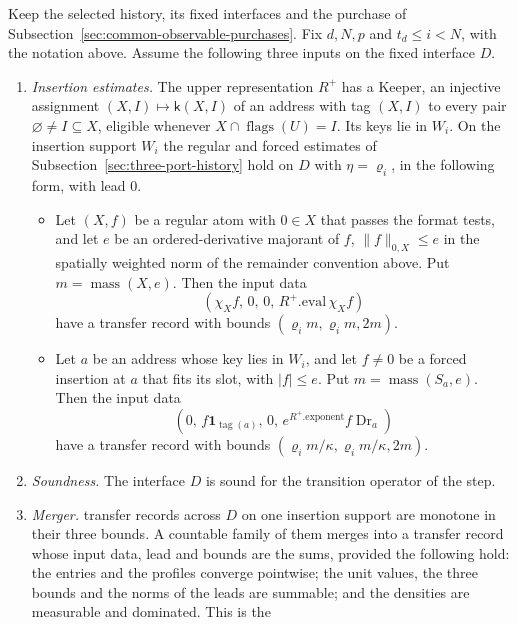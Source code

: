 \begin{proposition}
\label{prop:selected-zero-coordinate-coupon}
Keep the selected history, its fixed interfaces and the purchase of
Subsection~\ref{sec:common-observable-purchases}. Fix $d,N,p$ and
$t_d\le i<N$, with the notation above. Assume the following three
inputs on the fixed interface $D$.
\begin{enumerate}
\item[(K)] \emph{Insertion estimates.} The upper representation $R^+$
  has a Keeper, an injective assignment $(X,I)\mapsto\mathsf k(X,I)$
  of an address with tag $(X,I)$ to every pair
  $\varnothing\ne I\subseteq X$, eligible whenever
  $X\cap\operatorname{flags}(U)=I$. Its keys lie in $W_i$. On the insertion support
  $W_i$ the regular and forced estimates of
  Subsection~\ref{sec:three-port-history} hold on $D$ with $\eta=\varrho_i$,
  in the following form, with lead $0$.
  \begin{itemize}
  \item Let $(X,f)$ be a regular atom with $0\in X$ that passes the
    format tests, and let $e$ be an ordered-derivative majorant of $f$,
    $\|f\|_{0,X}\le e$ in the spatially weighted norm of the remainder
    convention above. Put
    $m=\operatorname{mass}(X,e)$. Then the input data
    \[
 (\chi_Xf,\,0,\,0,\,R^+.\mathrm{eval}\,\chi_Xf)
\] have a transfer record with
    bounds $(\varrho_im,\varrho_im,2m)$.
  \item Let $a$ be an address whose key lies in $W_i$, and let
    $f\ne0$ be a forced insertion at $a$ that fits its slot, with
    $|f|\le e$. Put $m=\operatorname{mass}(S_a,e)$. Then the input data
    \[
 (0,\,f\mathbf 1_{\operatorname{tag}(a)},\,0,\,
    e^{R^+.\mathrm{exponent}}f\operatorname{Dr}_a)
\] have a transfer record with
    bounds $(\varrho_im/\kappa,\varrho_im/\kappa,2m)$.
  \end{itemize}
\item[(S)] \emph{Soundness.} The interface $D$ is sound for the transition
  operator of the step.
\item[(M)] \emph{Merger.} transfer records across $D$ on one insertion support are monotone
  in their three bounds. A countable family of them merges into a
  transfer record whose input data, lead and bounds are the sums, provided the
  following hold: the entries and the profiles converge pointwise; the
  unit values, the three bounds and the norms of the leads are
  summable; and the densities are measurable and dominated. This is the

\end{enumerate}
\end{proposition}
